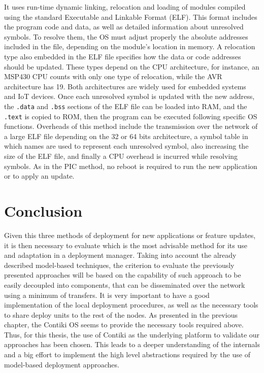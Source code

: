 \begin{itemize}
	It uses run-time dynamic linking, relocation and loading of modules compiled using the standard Executable and Linkable Format (ELF).
	This format includes the program code and data, as well as detailed information about unresolved symbols.
	To resolve them, the OS must adjust properly the absolute addresses included in the file, depending on the module's location in memory.
	A relocation type also embedded in the ELF file specifies how the data or code addresses should be updated.
	These types depend on the CPU architecture, for instance, an MSP430 CPU counts with only one type of relocation, while the AVR architecture has 19.
	Both architectures are widely used for embedded systems and IoT devices.
	Once each unresolved symbol is updated with the new address, the \texttt{.data} and \texttt{.bss} sections of the ELF file can be loaded into RAM, and the \texttt{.text} is copied to ROM, then the program can be executed following specific OS functions.
	Overheads of this method include the transmission over the network of a large ELF file depending on the 32 or 64 bits architecture, a symbol table in which names are used to represent each unresolved symbol, also increasing the size of the ELF file, and finally a CPU overhead is incurred while resolving symbols.
	As in the PIC method, no reboot is required to run the new application or to apply an update.
\end{itemize}

\section{Conclusion}
Given this three methods of deployment for new applications or feature updates, it is then necessary to evaluate which is the most advisable method for its use and adaptation in a deployment manager.
Taking into account the already described model-based techniques, the criterion to evaluate the previously presented approaches will be based on the capability of such approach to be easily decoupled into components, that can be disseminated over the network using a minimum of transfers.
It is very important to have a good implementation of the local deployment procedures, as well as the necessary tools to share deploy units to the rest of the nodes.
As presented in the previous chapter, the Contiki OS seems to provide the necessary tools required above.
Thus, for this thesis, the use of Contiki as the underlying platform to validate our approaches has been chosen.
This leads to a deeper understanding of the internals and a big effort to implement the high level abstractions required by the use of model-based deployment approaches.


